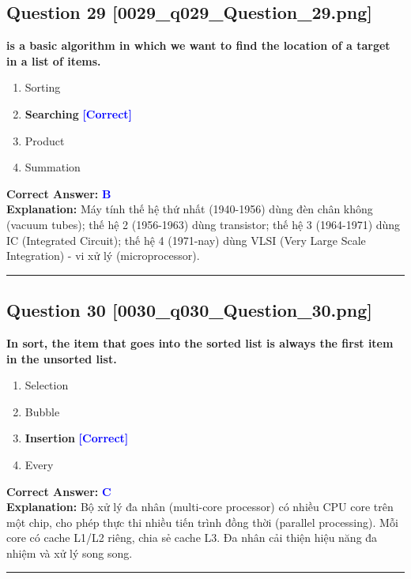 \documentclass[11pt,a4paper]{article}
\begin{document}
\begin{minipage}{\textwidth}
\subsection*{Question 29 \quad \footnotesize{[0029\_q029\_Question\_29.png]}}
\noindent \textbf{is a basic algorithm in which we want to find the location of a target in a list of items.}

\begin{enumerate}[label=\Alph*.]
    \item Sorting
    \item \textbf{Searching} \hfill \textcolor{blue}{\textbf{[Correct]}}
    \item Product
    \item Summation
\end{enumerate}

\noindent \textbf{Correct Answer:} \textcolor{blue}{\textbf{B}} \\[2pt]
\noindent \textbf{Explanation:} Máy tính thế hệ thứ nhất (1940-1956) dùng đèn chân không (vacuum tubes); thế hệ 2 (1956-1963) dùng transistor; thế hệ 3 (1964-1971) dùng IC (Integrated Circuit); thế hệ 4 (1971-nay) dùng VLSI (Very Large Scale Integration) - vi xử lý (microprocessor).

\par\vspace{0.3cm}
\hrule
\vspace{0.3cm}
\end{minipage}

\begin{minipage}{\textwidth}
\subsection*{Question 30 \quad \footnotesize{[0030\_q030\_Question\_30.png]}}
\noindent \textbf{In sort, the item that goes into the sorted list is always the first item in the unsorted list.}

\begin{enumerate}[label=\Alph*.]
    \item Selection
    \item Bubble
    \item \textbf{Insertion} \hfill \textcolor{blue}{\textbf{[Correct]}}
    \item Every
\end{enumerate}

\noindent \textbf{Correct Answer:} \textcolor{blue}{\textbf{C}} \\[2pt]
\noindent \textbf{Explanation:} Bộ xử lý đa nhân (multi-core processor) có nhiều CPU core trên một chip, cho phép thực thi nhiều tiến trình đồng thời (parallel processing). Mỗi core có cache L1/L2 riêng, chia sẻ cache L3. Đa nhân cải thiện hiệu năng đa nhiệm và xử lý song song.

\par\vspace{0.3cm}
\hrule
\vspace{0.3cm}
\end{minipage}
\end{document}
